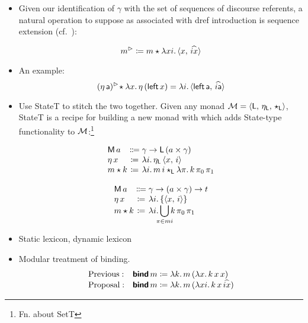 \begin{itemize}
	\item Given our identification of $\gamma$ with the set of sequences of discourse referents, a natural operation to suppose as associated with dref introduction is sequence extension (cf.~\citealt{Groote:2006, Unger:2012}): %
	\begin{defi}
		\[m^\rhd \coloneqq m \star \lambda xi.\,\langle x,\,\widehat{ix} \rangle\]
	\end{defi}
	
	\item An example:
	\[(\eta\,\textsf{a})^\rhd\! \star \lambda x.\,\eta\,(\textsf{left}\,x) = \lambda i.\,\langle \textsf{left}\,\textsf{a},\,\widehat{i\textsf{a}} \rangle\]%
	
	\item Use StateT to stitch the two together. Given any monad ${\cal M}= \langle \textsf{L},\,\eta_\textsf{L},\,\star_\textsf{L} \rangle$, StateT is a recipe for building a new monad with which adds State-type functionality to ${\cal M}$:\footnote{Fn. about SetT}%
	\begin{defi}\label{statet}
		\[\begin{array}[t]
			{@{}l@{}c@{}l@{}}
			\textsf{M}\,a &{}\Coloneqq{} &\gamma \ra \textsf{L}\,(a \times \gamma)%
			\\
			\eta\,x &{}\ceq{} &\lambda i .\,\eta_\textsf{L}\,\ab{x,\,i}
			\\
			m \star k &{}\ceq{} &\lambda i.\, m\,i\star_\textsf{L} \lambda \pi.\,k\,\pi_0\,\pi_1%
		\end{array}\]
	\end{defi}
	\begin{defi}\label{stateset}
		\[\begin{array}[t]
			{@{}l@{}c@{}l@{}}
			\textsf{M}\,a &{}\Coloneqq{} &\gamma \ra (a \times \gamma) \ra t%
			\\
			\eta\,x &{}\ceq{} &\lambda i.\left\{\ab{x,\,i}\right\}
			\\
			m \star k &{}\ceq{} &\lambda i.\displaystyle\bigcup_{\mathclap{\pi \in mi}}k\,\pi_0\,\pi_1%
		\end{array}\]
	\end{defi}
	

	\item Static lexicon, dynamic lexicon
	
	\item Modular treatment of binding.%
	\[\begin{array}{ll}
		\text{Previous}:& \bsf{bind}\,m \ceq \lambda k.\,m\,(\lambda x.\,k\,x\,x)%
		\\
		\text{Proposal}:& \bsf{bind}\,m \ceq \lambda k.\,m\,(\lambda xi.\,k\,x\,\widehat{ix})%
	\end{array}\]
	

\end{itemize}
